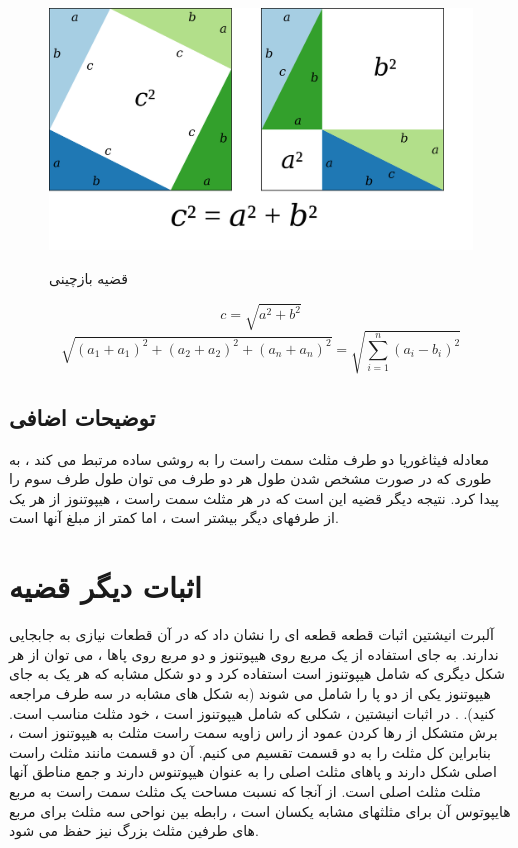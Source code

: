 \documentclass[12pt,onecolumn,a4paper]{article}
\begin{document}
\begin{figure}[h]
    \begin{center}
    \includegraphics[scale=0.12]{figs/Pythagoras-proof-anim.svg.png} \\
    \caption{قضیه بازچینی}
    \label{fig:my_label}
    \end{center}
\end{figure}
\begin{equation}
    c = \sqrt{a^2 + b^2}
\end{equation}
\begin{equation}
    \sqrt{(a_1 + a_1)^2 + (a_2 + a_2)^2 + (a_n + a_n)^2} = \sqrt{\sum_{i=1}^{n} (a_i - b_i)^2}
\end{equation}

\subsection{توضیحات اضافی}

معادله فیثاغوریا دو طرف مثلث سمت راست را به روشی ساده مرتبط می کند ، به طوری که در صورت مشخص شدن طول هر دو طرف می توان طول طرف سوم را پیدا کرد. نتیجه دیگر قضیه این است که در هر مثلث سمت راست ، هیپوتنوز از هر یک از طرفهای دیگر بیشتر است ، اما کمتر از مبلغ آنها است.


\section{اثبات دیگر قضیه}
آلبرت انیشتین اثبات قطعه قطعه ای را نشان داد که در آن قطعات نیازی به جابجایی ندارند. به جای استفاده از یک مربع روی هیپوتنوز و دو مربع روی پاها ، می توان از هر شکل دیگری که شامل هیپوتنوز است استفاده کرد و دو شکل مشابه که هر یک به جای هیپوتنوز یکی از دو پا را شامل می شوند (به شکل های مشابه در سه طرف مراجعه کنید). . در اثبات انیشتین ، شکلی که شامل هیپوتنوز است ، خود مثلث مناسب است. برش متشکل از رها کردن عمود از راس زاویه سمت راست مثلث به هیپوتنوز است ، بنابراین کل مثلث را به دو قسمت تقسیم می کنیم. آن دو قسمت مانند مثلث راست اصلی شکل دارند و پاهای مثلث اصلی را به عنوان هیپوتنوس دارند و جمع مناطق آنها مثلث مثلث اصلی است. از آنجا که نسبت مساحت یک مثلث سمت راست به مربع هایپوتوس آن برای مثلثهای مشابه یکسان است ، رابطه بین نواحی سه مثلث برای مربع های طرفین مثلث بزرگ نیز حفظ می شود.
\end{document}
